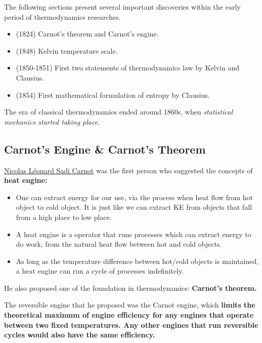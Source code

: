 \documentclass[class=article, crop=false, 12pt]{standalone}
\begin{document}
The following sections present several important discoveries within the early period of thermodynamics researches.
\begin{itemize}
    \item (1824) Carnot's theorem and Carnot's engine.
    \item (1848) Kelvin temperature scale.
    \item (1850-1851) First two statements of thermodynamics  law by Kelvin and Clausius.
    \item (1854) First mathematical formulation of entropy by Clausius.
\end{itemize}

The era of classical thermodynamics ended around 1860s, 
when \it{statistical mechanics} started taking place. 

\subsection{Carnot's Engine \& Carnot's Theorem}

\href{https://en.wikipedia.org/wiki/Nicolas_L\%C3\%A9onard_Sadi_Carnot}{Nicolas Léonard Sadi Carnot}
was the first person who suggested the concepts of \bf{heat engine}:
\begin{itemize}
    \item One can extract energy for our use, via the process when heat flow from hot object to cold object.
    It is just like we can extract KE from objects that fall from a high place to low place.

    \item A heat engine is a operator that runs  processes which can extract energy to do work, 
    from the natural heat flow between hot and cold objects.

    \item As long as the temperature difference between hot/cold objects is maintained,
    a heat engine can run a cycle of processes indefinitely. 
\end{itemize}



He also proposed one of the foundation in thermodynamics: \bf{Carnot's theorem}.

The reversible engine that he proposed was the Carnot engine, 
which \bf{limits the theoretical maximum of engine efficiency for any engines that operate between two fixed temperatures}.
Any other engines that run reversible cycles would also have the same efficiency.
\end{document}
